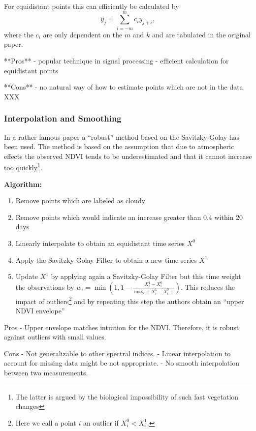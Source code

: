 For equidistant points this can efficiently be calculated by
$$
    \hat y_{j}=\sum_{i=-m}^{m} c_{i} y_{j+i},
$$
where the $c_i$ are only dependent on the $m$ and $k$ and are tabulated in the original paper.

**Pros**
- popular technique in signal processing
- efficient calculation for equidistant points

**Cons**
- no natural way of how to estimate points which are not in the data. XXX

\subsubsection*{Interpolation and Smoothing}
In a rather famous paper \cite{chenSimpleMethodReconstructing2004a} a ``robust'' method based on the Savitzky-Golay has been used.
The method is based on the assumption that due to atmospheric effects the observed NDVI tends to be underestimated and that it cannot increase too quickly\footnote{The latter is argued by the biological impossibility of such fast vegetation changes}.

\textbf{Algorithm:}
\begin{enumerate}
    \item Remove points which are labeled as cloudy
    \item Remove points which would indicate an increase greater than 0.4 within 20 days
    \item Linearly interpolate to obtain an equidistant time series $X^0$
    \item Apply the Savitzky-Golay Filter to obtain a new time series $X^1$
    \item Update $X^1$ by applying again a Savitzky-Golay Filter but this time weight the observations by $w_i = \min\left(1, 1 - \frac{X^1_i-X^0_i}{\max_i\|X^1_i-X^0_i\|}\right)$. This reduces the impact of outliers\footnote{Here we call a point $i$ an outlier if $X^0_i<X^1_i$.} and by repeating this step the authors obtain an ``upper NDVI envelope''
\end{enumerate}

Pros
- Upper envelope matches intuition for the NDVI. Therefore, it is robust against outliers with small values.

Cons
- Not generalizable to other spectral indices.
- Linear interpolation to account for missing data might be not appropriate.
- No smooth interpolation between two measurements.

